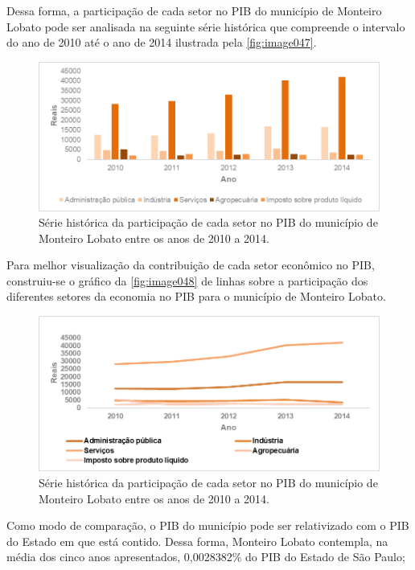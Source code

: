 Dessa forma, a participação de cada setor no PIB do município de Monteiro Lobato pode ser analisada na seguinte série histórica que compreende o intervalo do ano de 2010 até o ano de 2014 ilustrada pela \autoref{fig:image047}.

  \begin{figure}[h!]
 	\centering
 	\includegraphics[width=0.85\linewidth]{produtos/proddois/image047}
 	\caption{Série histórica da participação de cada setor no PIB do município de Monteiro Lobato entre os anos de 2010 a 2014.}
 	\label{fig:image047}
 \end{figure}

Para melhor visualização da contribuição de cada setor econômico no PIB, construiu-se o gráfico da \autoref{fig:image048} de linhas sobre a participação dos diferentes setores da economia no PIB para o município de Monteiro Lobato.

 \begin{figure}[h!]
	\centering
	\includegraphics[width=0.85\linewidth]{produtos/proddois/image048}
	\caption{Série histórica da participação de cada setor no PIB do município de Monteiro Lobato entre os anos de 2010 a 2014.}
	\label{fig:image048}
\end{figure}

Como modo de comparação, o PIB do município pode ser relativizado com o PIB do Estado em que está contido. Dessa forma, Monteiro Lobato contempla, na média dos cinco anos apresentados, 0,0028382\% do PIB do Estado de São Paulo; 

